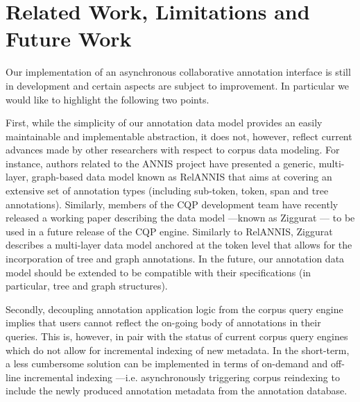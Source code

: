 \documentclass{sig-alternate}
\begin{document}
\section{Related Work, Limitations and Future Work}\label{sec:future}
Our implementation of an asynchronous collaborative annotation interface is still in development
and certain aspects are subject to improvement. In particular we would like to highlight the
following two points.

First, while the simplicity of our annotation data model provides an easily maintainable and
implementable abstraction, it does not, however, reflect current advances made by other researchers
with respect to corpus data modeling. For instance, authors related to the ANNIS project have
presented a generic, multi-layer, graph-based data model known as RelANNIS \cite{Krause2016} that
aims at covering an extensive set of annotation types (including sub-token, token, span and
tree annotations). Similarly, members of the CQP development team have recently released a working
paper describing the data model ---known as Ziggurat \cite{Evert2015}--- to be
used in a future release of the CQP engine. Similarly to RelANNIS, Ziggurat describes a multi-layer
data model anchored at the token level that allows for the incorporation of tree and graph
annotations. In the future, our annotation data model should be extended to be compatible with their
specifications (in particular, tree and graph structures).

Secondly, decoupling annotation application logic from the corpus query engine implies that
users cannot reflect the on-going body of annotations in their queries. This is, however, in
pair with the status of current corpus query engines which do not allow for incremental indexing of
new metadata. In the short-term, a less cumbersome solution can be implemented in terms of
on-demand and off-line incremental indexing ---i.e. asynchronously triggering corpus
reindexing to include the newly produced annotation metadata from the annotation database.
\end{document}
